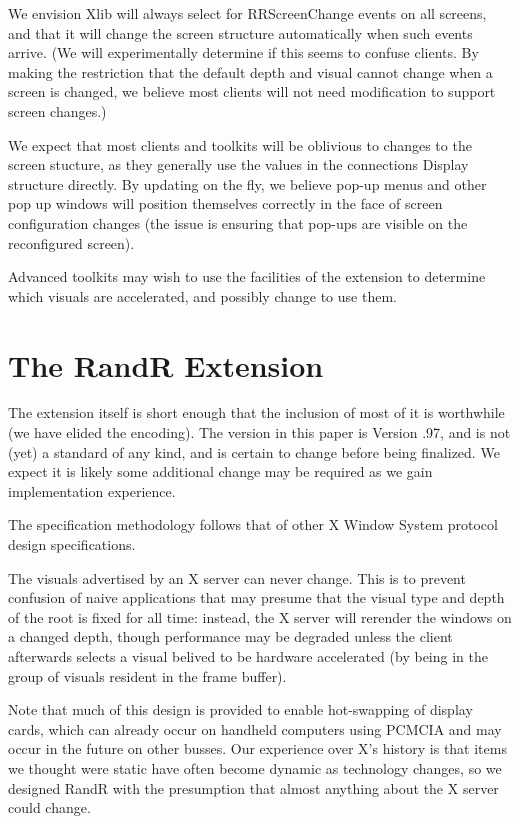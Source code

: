 \documentclass[twocolumn]{article}
\begin{document}
We envision Xlib will always select for RRScreenChange events on all
screens, and that it will change the screen structure automatically
when such events arrive. (We will experimentally determine if this
seems to confuse clients.  By making the restriction that the default
depth and visual cannot change when a screen is changed, we believe
most clients will not need modification to support screen changes.)

We expect that most clients and toolkits will be oblivious to changes
to the screen stucture, as they generally use the values in the
connections Display structure directly.  By updating on the fly, we
believe pop-up menus and other pop up windows will position themselves
correctly in the face of screen configuration changes (the issue is
ensuring that pop-ups are visible on the reconfigured screen).

Advanced toolkits may wish to use the facilities of the extension
to determine which visuals are accelerated, and possibly change to
use them.

\section{The RandR Extension}

The extension itself is short enough that the inclusion of most of it
is worthwhile (we have elided the encoding). The version in this paper
is Version .97, and is not (yet) a standard of any kind, and is
certain to change before being finalized.  We expect it is likely some
additional change may be required as we gain implementation experience.

The specification methodology follows that of other X Window System
protocol design specifications.

The visuals advertised by an X server can never change.  This is to
prevent confusion of naive applications that may presume that the visual
type and depth of the root is fixed for all time: instead, the X server will
rerender the windows on a changed depth, though performance may be degraded
unless the client afterwards selects a visual belived to be hardware
accelerated (by being in the group of visuals resident in the
frame buffer).

Note that much of this design is provided to enable hot-swapping of
display cards, which can already occur on handheld computers using PCMCIA
and may occur in the future on other busses. Our experience over X's history
is that items we thought were static have often become dynamic as technology
changes, so we designed RandR with the presumption that almost anything about
the X server could change.
\end{document}
